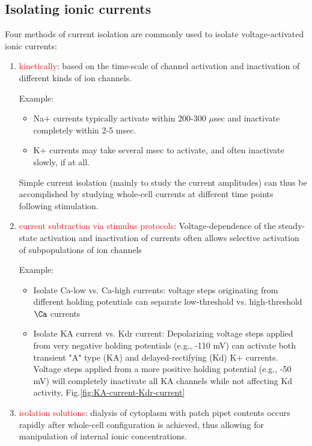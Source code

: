 \subsection{Isolating ionic currents}
\label{sec:isolating-ionic-current-components}

Four methods of current isolation are commonly used to isolate voltage-activated
ionic currents:
\begin{enumerate}
  \item \textcolor{red}{kinetically}: based on the time-scale of channel
  activation and inactivation of different kinds of ion channels.

Example:
\begin{itemize}
  \item  Na+ currents typically activate within 200-300 $\mu$sec and inactivate
completely within 2-5 msec.
  \item K+ currents may take several msec to activate, and often inactivate
slowly, if at all.
\end{itemize}

Simple current isolation (mainly to study the
current amplitudes) can thus be accomplished by studying whole-cell
currents at different time points following stimulation.

  \item \textcolor{red}{current subtraction via stimulus protocols}:
  Voltage-dependence of the steady-state activation and inactivation
of currents often allows selective activation of subpopulations
of ion channels

Example:
\begin{itemize}
  \item Isolate Ca-low vs. Ca-high currents: voltage steps originating from
  different holding potentials can separate low-threshold vs. high-threshold $\Ca$ currents

  \item Isolate KA current vs. Kdr current: Depolarizing voltage steps applied
  from very negative holding potentials (e.g., -110 mV) can activate both
  transient "A" type (KA) and delayed-rectifying (Kd)
K+ currents. Voltage steps applied from a more positive holding potential (e.g.,
-50 mV) will completely inactivate all KA channels while not affecting Kd
activity, Fig.\ref{fig:KA-current-Kdr-current}

\end{itemize}


  \item \textcolor{red}{isolation solutions}: dialysis of cytoplasm with patch
  pipet contents occurs rapidly after whole-cell configuration is achieved, thus
  allowing for manipulation of internal ionic concentrations.


\end{enumerate}
